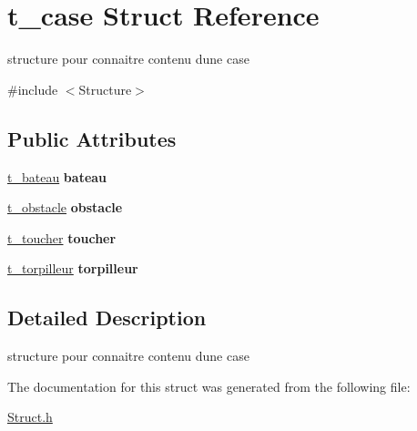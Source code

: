 \hypertarget{structt__case}{}\section{t\+\_\+case Struct Reference}
\label{structt__case}


structure pour connaitre contenu d\textquotesingle{}une case  




{\ttfamily \#include $<$Structure$>$}

\subsection*{Public Attributes}
\begin{DoxyCompactItemize}
\item 
\hypertarget{structt__case_ad16c3eadf015cbd5dd99436d3b3d15c8}{}\hyperlink{_struct_8h_a1d4b3af78c5f9b3f943007e525cefc94}{t\+\_\+bateau} {\bfseries bateau}\label{structt__case_ad16c3eadf015cbd5dd99436d3b3d15c8}

\item 
\hypertarget{structt__case_a3a9fab29776775d47be67bf1549f8447}{}\hyperlink{_struct_8h_aba77e4bb172ecd4a675a651dc54cdd9d}{t\+\_\+obstacle} {\bfseries obstacle}\label{structt__case_a3a9fab29776775d47be67bf1549f8447}

\item 
\hypertarget{structt__case_a106416411e214b47d6d88b68baae7c84}{}\hyperlink{_struct_8h_a5f32f22a43adf79ef72d31d445643c9d}{t\+\_\+toucher} {\bfseries toucher}\label{structt__case_a106416411e214b47d6d88b68baae7c84}

\item 
\hypertarget{structt__case_a5638e828cde121bb4ad71f250a42a4f7}{}\hyperlink{_struct_8h_a072aa075110c11ec4eeaab41c77db60c}{t\+\_\+torpilleur} {\bfseries torpilleur}\label{structt__case_a5638e828cde121bb4ad71f250a42a4f7}

\end{DoxyCompactItemize}


\subsection{Detailed Description}
structure pour connaitre contenu d\textquotesingle{}une case 

The documentation for this struct was generated from the following file\+:\begin{DoxyCompactItemize}
\item 
\hyperlink{_struct_8h}{Struct.\+h}\end{DoxyCompactItemize}
